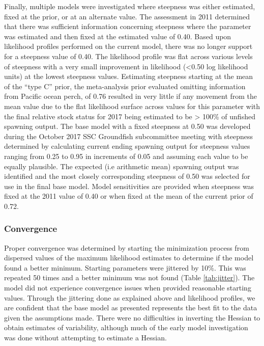 \documentclass[12pt,]{article}
\begin{document}
Finally, multiple models were investigated where steepness was either
estimated, fixed at the prior, or at an alternate value. The assessment
in 2011 determined that there was sufficient information concerning
steepness where the parameter was estimated and then fixed at the
estimated value of 0.40. Based upon likelihood profiles performed on the
current model, there was no longer support for a steepness value of
0.40. The likelihood profile was flat across various levels of steepness
with a very small improvement in likelihood (\textless{}0.50 log
likelihood units) at the lowest steepness values. Estimating steepness
starting at the mean of the ``type C'' prior, the meta-analysis prior
evaluated omitting information from Pacific ocean perch, of 0.76
resulted in very little if any movement from the mean value due to the
flat likelihood surface across values for this parameter with the final
relative stock status for 2017 being estimated to be \textgreater{}
100\% of unfished spawning output. The base model with a fixed steepness
at 0.50 was developed during the October 2017 SSC Groundfish
subcommittee meeting with steepness determined by calculating current
ending spawning output for steepness values ranging from 0.25 to 0.95 in
increments of 0.05 and assuming each value to be equally plausible. The
expected (i.e arithmetic mean) spawning output was identified and the
most closely corresponding steepness of 0.50 was selected for use in the
final base model. Model sensitivities are provided when steepness was
fixed at the 2011 value of 0.40 or when fixed at the mean of the current
prior of 0.72.

\subsubsection{Convergence}\label{convergence}

Proper convergence was determined by starting the minimization process
from dispersed values of the maximum likelihood estimates to determine
if the model found a better minimum. Starting parameters were jittered
by 10\%. This was repeated 50 times and a better minimum was not found
(Table \ref{tab:jitter}). The model did not experience convergence
issues when provided reasonable starting values. Through the jittering
done as explained above and likelihood profiles, we are confident that
the base model as presented represents the best fit to the data given
the assumptions made. There were no difficulties in inverting the
Hessian to obtain estimates of variability, although much of the early
model investigation was done without attempting to estimate a Hessian.
\end{document}
